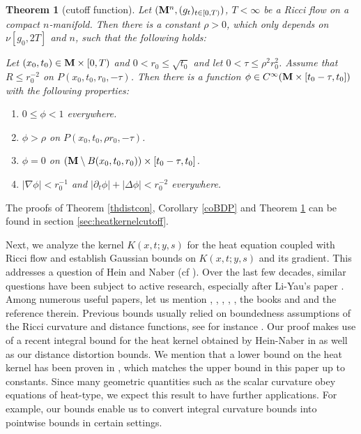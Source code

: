 \documentclass[11pt]{amsart}
\numberwithin{equation}{section}
\newtheorem{theorem}{Theorem}[section]
\def\M{{\bf M}}
\numberwithin{equation}{section}
\begin{document}
\begin{theorem}[cutoff function] \label{Thm:cutoffnoLp}
Let $(\M^n, (g_t)_{t \in [0,T)} )$, $T < \infty$ be a Ricci flow on a compact $n$-manifold.
Then there is a constant $\rho > 0$, which only depends on $\nu[g_0, 2T]$ and $n$, such that the following holds:

Let $(x_0, t_0) \in \M \times [0,T)$ and $0 < r_0 \leq \sqrt{t_0}$ and let $0 < \tau \leq  \rho^2 r_0^2$.
Assume that $R \leq r_0^{-2}$ on $P(x_0, t_0, r_0, - \tau)$.
Then there is a function $\phi \in C^\infty (\M \times [t_0 - \tau,t_0])$ with the following properties:
\begin{enumerate}[label=(\alph*)]
\item $0 \leq \phi < 1$ everywhere.
\item $\phi > \rho$ on $P(x_0, t_0, \rho r_0, - \tau)$.
\item $\phi = 0$ on $(\M \setminus B(x_0, t_0, r_0) ) \times [t_0 - \tau, t_0]$.
\item $|\nabla \phi | < r_0^{-1}$ and $|\partial_t \phi| + |\Delta \phi | < r_0^{-2}$ everywhere.
\end{enumerate}
\end{theorem}

The proofs of Theorem \ref{thdistcon}, Corollary \ref{coBDP} and Theorem \ref{Thm:cutoffnoLp} can be found in section \ref{sec:heatkernelcutoff}.

Next, we analyze the kernel $K(x,t; y,s)$ for the heat equation coupled with Ricci flow and establish Gaussian bounds on $K(x,t; y,s)$ and its gradient.
This addresses a question of Hein and Naber (cf \cite[Remark 1.15]{HN:1}).
Over the last few decades, similar questions have been subject to active research, especially after Li-Yau's paper \cite{LY:1}.
Among numerous useful papers, let us mention \cite{BCG:1}, \cite{ChH:1}, \cite{GH:2}, \cite{LT:1}, \cite{HN:1}, the books \cite{L:1} and \cite{Gr:2} and the reference therein.
Previous bounds usually relied on boundedness assumptions of the Ricci curvature and distance functions, see for instance \cite{Z06:1}.
Our proof makes use of a recent integral bound for the heat kernel obtained by Hein-Naber in \cite{HN:1} as well as our distance distortion bounds.
We mention that a lower bound on the heat kernel has been proven in \cite{Z11:1}, which matches the upper bound in this paper up to constants. 
Since many geometric quantities such as the scalar curvature obey equations of heat-type, we expect this result to have further applications.
For example, our bounds enable us to convert integral curvature bounds into pointwise bounds in certain settings.
\end{document}
